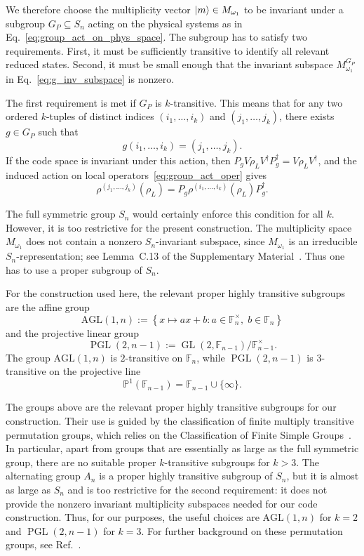 \documentclass[10pt,twocolumn,superscriptaddress,aps,amsmath,amssymb,citeautoscript,floatfix,prx,longbibliography]{revtex4-2}
\theoremstyle{plain}
\theoremstyle{plain}
\theoremstyle{plain}
\theoremstyle{plain}
\theoremstyle{plain}
\theoremstyle{plain}
\begin{document}
We therefore choose the multiplicity vector $\ket m\in M_{\omega_1}$ to be invariant under a subgroup $G_P\subseteq S_n$ acting on the physical systems as in Eq.~\eqref{eq:group_act_on_phys_space}. The subgroup has to satisfy two requirements. First, it must be sufficiently transitive to identify all relevant reduced states. Second, it must be small enough that the invariant subspace $M_{\omega_1}^{G_P}$ in Eq.~\eqref{eq:g_inv_subspace} is nonzero.

The first requirement is met if $G_P$ is $k$-transitive. This means that for any two ordered $k$-tuples of distinct indices $(i_1,\ldots,i_k)$ and $(j_1,\ldots,j_k)$, there exists $g\in G_P$ such that
$$
    g(i_1,\ldots,i_k)=(j_1,\ldots,j_k).
$$
If the code space is invariant under this action, then $P_gV\rho_LV^\dagger P_g^\dagger=V\rho_LV^\dagger$, and the induced action on local operators~\eqref{eq:group_act_oper} gives
$$
    \rho^{(j_1,\ldots,j_k)}(\rho_L)
    =
    P_g
    \rho^{(i_1,\ldots,i_k)}(\rho_L)
    P_g^\dagger .
$$

The full symmetric group $S_n$ would certainly enforce this condition for all $k$. However, it is too restrictive for the present construction. The multiplicity space $M_{\omega_1}$ does not contain a nonzero $S_n$-invariant subspace, since $M_{\omega_1}$ is an irreducible $S_n$-representation; see Lemma~C.13 of the Supplementary Material~\cite{SuppMat}. Thus one has to use a proper subgroup of $S_n$.

For the construction used here, the relevant proper highly transitive subgroups are the affine group
\begin{equation}\label{eq:AGL_def}
    \mathrm{AGL}(1,n)
    :=
    \left\{
        x\mapsto ax+b:
        a\in\mathbb F_n^\times,\;
        b\in\mathbb F_n
    \right\}
\end{equation}
and the projective linear group
\begin{equation}\label{eq:PGL_def}
    \operatorname{PGL}(2,n-1)
    :=
    \operatorname{GL}\left(2,\mathbb F_{n-1}\right)
    /\mathbb F_{n-1}^\times .
\end{equation}
The group $\mathrm{AGL}(1,n)$ is $2$-transitive on $\mathbb F_n$, while $\operatorname{PGL}(2,n-1)$ is $3$-transitive on the projective line
$$
    \mathbb P^1(\mathbb F_{n-1})
    =
    \mathbb F_{n-1}\cup\{\infty\}.
$$

The groups above are the relevant proper highly transitive subgroups for our construction. Their use is guided by the classification of finite multiply transitive permutation groups, which relies on the Classification of Finite Simple Groups~\cite{GorensteinLyonsSolomon1994}. In particular, apart from groups that are essentially as large as the full symmetric group, there are no suitable proper $k$-transitive subgroups for $k>3$. The alternating group $A_n$ is a proper highly transitive subgroup of $S_n$, but it is almost as large as $S_n$ and is too restrictive for the second requirement: it does not provide the nonzero invariant multiplicity subspaces needed for our code construction. Thus, for our purposes, the useful choices are $\mathrm{AGL}(1,n)$ for $k=2$ and $\operatorname{PGL}(2,n-1)$ for $k=3$. For further background on these permutation groups, see Ref.~\cite{DixonMortimer1996}.
\end{document}

